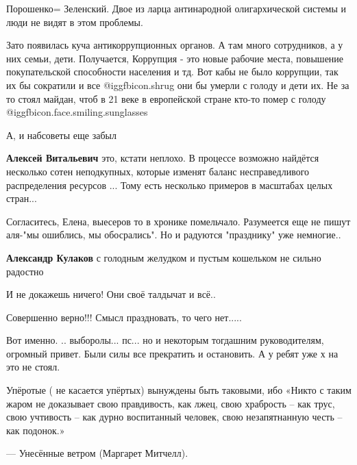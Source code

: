 \begin{itemize}
Порошенко= Зеленский.
Двое из ларца антинародной олигархической системы и люди не видят в этом проблемы.


Зато появилась куча антикоррупционных органов. А там много сотрудников, а у них
семьи, дети. Получается, Коррупция - это новые рабочие места, повышение
покупательской способности населения и тд. Вот кабы не было коррупции, так их
бы сократили и все @igg{fbicon.shrug}  они бы умерли с голоду и дети их. Не за то стоял
майдан, чтоб в 21 веке в европейской стране кто-то помер с голоду @igg{fbicon.face.smiling.sunglasses} 

\begin{itemize} %
А, и набсоветы еще забыл

\textbf{Алексей Витальевич} это, кстати неплохо. В процессе возможно найдётся несколько сотен неподкупных, которые изменят баланс несправедливого распределения ресурсов ... Тому есть несколько примеров в масштабах целых стран...
\end{itemize} %


Согласитесь, Елена, выесеров то в хронике помельчало. Разумеется еще не пишут
аля-"мы ошиблись, мы обосрались". Но и радуются "празднику" уже немногие..

\begin{itemize} %
\textbf{Александр Кулаков} с голодным желудком и пустым кошельком не сильно радостно
\end{itemize} %

И не докажешь ничего! Они своё талдычат и всё..

Совершенно верно!!! Смысл праздновать, то чего нет.....


Вот именно. .. выборолы... пс... но и некоторым тогдашним руководителям,
огромный привет. Были силы все прекратить и остановить. А у ребят уже х на это
не стоял.


Упёротые ( не касается упёртых) вынуждены быть таковыми, ибо «Никто с таким
жаром не доказывает свою правдивость, как лжец, свою храбрость – как трус, свою
учтивость – как дурно воспитанный человек, свою незапятнанную честь – как
подонок.»

— Унесённые ветром (Маргарет Митчелл).


\end{itemize}
